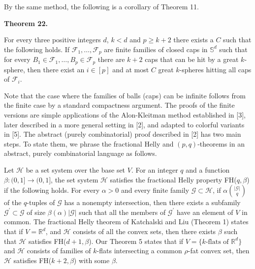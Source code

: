 \par
\par
\par
By the same method, the following is a corollary of Theorem 11.
\par
\par
\par\medskip\noindent\textbf{Theorem 22.}\par
For every three positive integers $d$, $k<d$ and $p\geq k+2$ there exists a $C$ such that the following holds. If $\mathcal{F}_{1},\ldots,\mathcal{F}_{p}$ are finite families of closed caps in $\mathbb{S}^{d}$ such that for every $B_{1}\in\mathcal{F}_{1},\ldots,B_{p}\in\mathcal{F}_{p}$ there are $k+2$ caps that can be hit by a great $k$-sphere, then there exist an $i\in[p]$ and at most $C$ great $k$-spheres hitting all caps of $\mathcal{F}_{i}$.
\par
\par
\par
Note that the case where the families of balls (caps) can be infinite follows from the finite case by a standard compactness argument. The proofs of the finite versions are simple applications of the Alon-Kleitman method established in [3], later described in a more general setting in [2], and adapted to colorful variants in [5]. The abstract (purely combinatorial) proof described in [2] has two main steps. To state them, we phrase the fractional Helly and $(p,q)$-theorems in an abstract, purely combinatorial language as follows.
\par
\par
Let $\mathcal{H}$ be a set system over the base set $V$. For an integer $q$ and a function $\beta\colon(0,1]\to(0,1]$, the set system $\mathcal{H}$ satisfies the fractional Helly property FH($q,\beta$) if the following holds. For every $\alpha>0$ and every finite family $\mathcal{G}\subset\mathcal{H}$, if $\alpha\binom{|\mathcal{G}|}{q}$ of the $q$-tuples of $\mathcal{G}$ has a nonempty intersection, then there exists a subfamily $\mathcal{G}^{\prime}\subset\mathcal{G}$ of size $\beta(\alpha)|\mathcal{G}|$ such that all the members of $\mathcal{G}^{\prime}$ have an element of $V$ in common. The fractional Helly theorem of Katchalski and Liu (Theorem 1) states that if $V=\mathbb{R}^{d}$, and $\mathcal{H}$ consists of all the convex sets, then there exists $\beta$ such that $\mathcal{H}$ satisfies FH($d+1,\beta$). Our Theorem 5 states that if $V=\{k\text{-flats of }\mathbb{R}^{d}\}$ and $\mathcal{H}$ consists of families of $k$-flats intersecting a common $\rho$-fat convex set, then $\mathcal{H}$ satisfies FH($k+2,\beta$) with some $\beta$.

